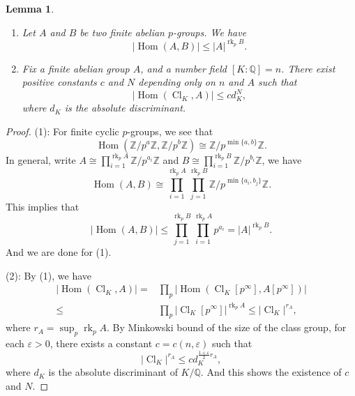 \documentclass[12pt,a4paper]{amsart}
\numberwithin{equation}{section}%
\theoremstyle{plain}%
\newtheorem{lemma}[theorem]{Lemma}%
\theoremstyle{definition}%
\theoremstyle{remark}%
\begin{document}
	\begin{lemma}\label{lemma: restricted ramification for sovlable extensions}
		\begin{enumerate}
			\item Let $A$ and $B$ be two finite abelian $p$-groups.
			We have
			\begin{equation*}
				\lvert \operatorname{Hom}(A,B)\rvert\leq\lvert A\rvert^{\operatorname{rk}_p B}.
			\end{equation*}
			\item Fix a finite abelian group $A$, and a number field $[K:\mathbb{Q}]=n$.
			There exist positive constants $c$ and $N$ depending only on $n$ and $A$ such that 
			\begin{equation}\label{eqn: restricted ramification for sovlable extensions lemma 1}
				\lvert\operatorname{Hom}(\operatorname{Cl}_K,A)\rvert\leq c d_K^{N},
			\end{equation}
			where $d_K$ is the absolute discriminant.
		\end{enumerate}
	\end{lemma}
	\begin{proof}
		(1):
		For finite cyclic $p$-groups, we see that
		\begin{equation*}
			\operatorname{Hom}(\mathbb{Z}/p^a\mathbb{Z},\mathbb{Z}/p^b\mathbb{Z})\cong\mathbb{Z}/p^{\min\{a,b\}}\mathbb{Z}.
		\end{equation*}
		In general, write $A\cong\prod_{i=1}^{\operatorname{rk}_p A}\mathbb{Z}/p^{a_i}\mathbb{Z}$ and $B\cong\prod_{i=1}^{\operatorname{rk}_p B}\mathbb{Z}/p^{b_i}\mathbb{Z}$, we have
		\begin{equation*}
			\operatorname{Hom}(A,B)\cong\prod_{i=1}^{\operatorname{rk}_p A}\prod_{j=1}^{\operatorname{rk}_p B}\mathbb{Z}/p^{\min\{a_i,b_j\}}\mathbb{Z}.
		\end{equation*}
		This implies that
		\begin{equation*}
			\lvert\operatorname{Hom}(A,B)\rvert\leq\prod_{j=1}^{\operatorname{rk}_p B}\prod_{i=1}^{\operatorname{rk}_p A}p^{a_i}=\lvert A\rvert^{\operatorname{rk}_p B}.
		\end{equation*}
		And we are done for (1).
		
		(2):
		By (1), we have
		\begin{equation*}
			\begin{aligned}
				\lvert\operatorname{Hom}(\operatorname{Cl}_K,A)\rvert=&\prod_{p}\lvert\operatorname{Hom}(\operatorname{Cl}_K[p^\infty],A[p^\infty])\rvert
				\\
				\leq&\prod_p\lvert\operatorname{Cl}_K[p^\infty]\rvert^{\operatorname{rk}_p A}
				\leq\lvert\operatorname{Cl}_K\rvert^{r_A},
			\end{aligned}
		\end{equation*}
		where $r_A=\sup_p\operatorname{rk}_pA$.
		By Minkowski bound of the size of the class group, for each $\varepsilon>0$, there exists a constant $c=c(n,\varepsilon)$ such that
		\begin{equation*}
			\lvert\operatorname{Cl}_K\rvert^{r_A}\leq c d_K^{\frac{1+\varepsilon}{2}r_A},
		\end{equation*}
		where $d_K$ is the absolute discriminant of $K/\mathbb{Q}$.
		And this shows the existence of $c$ and $N$.
	\end{proof}
\end{document}
